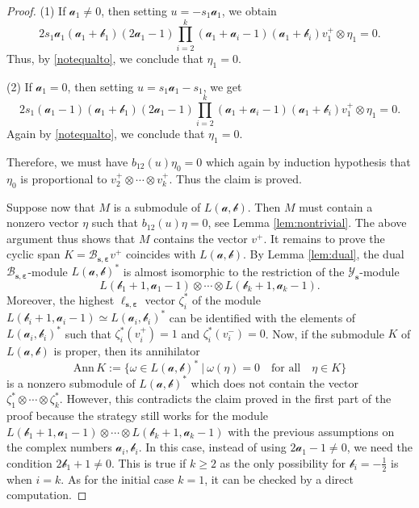\documentclass[11pt,reqno]{amsart}
\numberwithin{equation}{section}
\theoremstyle{definition}
\theoremstyle{remark}
\newcommand{\mc}{\mathcal}
\newcommand{\gge}{\geqslant}
\newcommand{\YMN}{{\mathscr{Y}_{\bm s}}}
\newcommand{\BMN}{{\mathscr{B}_{\bm s,\bm \ve}}}
\newcommand{\ve}{\varepsilon}
\newcommand{\s}{{\bm s}}
\begin{document}
\begin{proof}
(1) If $\mc a_1\ne 0$, then setting $u=-s_1\mc a_1$, we obtain
\[
2s_1\mc a_1(\mc a_1+\mc b_1)(2\mc a_1-1)\prod_{i=2}^k(\mc a_1+\mc a_i-1)(\mc a_1+\mc b_i)v_1^+\otimes \eta_1=0.
\]
Thus, by \eqref{notequalto}, we conclude that $\eta_1=0$.

(2) If $\mc a_1=0$, then setting $u=s_1\mc a_1-s_1$, we get
\[
2s_1(\mc a_1-1)(\mc a_1+\mc b_1)(2\mc a_1-1)\prod_{i=2}^k(\mc a_1+\mc a_i-1)(\mc a_1+\mc b_i)v_1^+\otimes \eta_1=0.
\]
Again by \eqref{notequalto}, we conclude that $\eta_1=0$.

Therefore, we must have $b_{12}(u)\eta_0=0$ which again by induction hypothesis that $\eta_0$ is proportional to $v_2^+\otimes\cdots\otimes v_k^+$. Thus the claim is proved.

Suppose now that $M$ is a submodule of $L(\bm{\mc a,\mc b})$. Then $M$ must contain a nonzero vector $\eta$ such that $b_{12}(u)\eta=0$, see Lemma \ref{lem:nontrivial}. The above argument thus shows that $M$ contains the vector $v^+$. It remains to prove the cyclic span $K=\BMN v^+$ coincides with $L(\bm{\mc a,\mc b})$. By Lemma \ref{lem:dual}, the dual $\BMN$-module $L(\bm{\mc a,\mc b})^*$ is almost isomorphic to the restriction of the $\YMN$-module
\[
L(\mc b_1+1,\mc a_1-1)\otimes \cdots\otimes L(\mc b_k+1,\mc a_k-1).
\]
Moreover, the highest $\ell_{\s,\bm\ve}$ vector $\zeta_i^*$ of the module $L(\mc b_i+1,\mc a_i-1)\simeq L(\mc a_i,\mc b_i)^*$ can be identified with the elements of $L(\mc a_i,\mc b_i)^*$ such that $\zeta_i^*(v_i^+)=1$ and $\zeta_i^*(v_i^-)=0$. Now, if the submodule $K$ of $L(\bm{\mc a,\mc b})$ is proper, then its annihilator
\[
\mathrm{Ann}\,K:=\{\omega\in L(\bm{\mc a,\mc b})^*~|~\omega(\eta)=0 \quad\text{for all}\quad \eta\in K \}
\]
is a nonzero submodule of $L(\bm{\mc a,\mc b})^*$ which does not contain the vector $\zeta_1^*\otimes\cdots\otimes \zeta_k^*$. However, this contradicts the claim proved in the first part of the proof because the strategy still works for the module $L(\mc b_1+1,\mc a_1-1)\otimes \cdots\otimes L(\mc b_k+1,\mc a_k-1)$ with the previous assumptions on the complex numbers $\mc a_i,\mc b_i$. In this case, instead of using $2\mc a_1-1\ne 0$, we need the condition $2\mc b_1+1\ne 0$. This is true if $k\gge 2$ as the only possibility for $\mc b_i=-\frac12$ is when $i=k$. As for the initial case $k=1$, it can be checked by a direct computation.
\end{proof}
\end{document}

